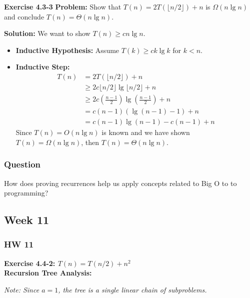 \documentclass{article}
\theoremstyle{theorem}
\theoremstyle{definition}
\theoremstyle{remark}
\begin{document}
\textbf{Exercise 4.3-3}
\textbf{Problem:} Show that $T(n) = 2T(\lfloor n/2 \rfloor) + n$ is $\Omega(n \lg n)$ and conclude $T(n) = \Theta(n \lg n)$.

\textbf{Solution:}
We want to show $T(n) \geq cn \lg n$.
\begin{itemize}
    \item \textbf{Inductive Hypothesis:} Assume $T(k) \geq ck \lg k$ for $k < n$.
    \item \textbf{Inductive Step:}
    \begin{align*}
    T(n) &= 2T(\lfloor n/2 \rfloor) + n \\
    &\geq 2c \lfloor n/2 \rfloor \lg \lfloor n/2 \rfloor + n \\
    &\geq 2c \left(\frac{n-1}{2}\right) \lg \left(\frac{n-1}{2}\right) + n \\
    &= c(n-1)(\lg(n-1) - 1) + n \\
    &= c(n-1)\lg(n-1) - c(n-1) + n
    \end{align*}
    Since $T(n) = O(n \lg n)$ is known and we have shown $T(n) = \Omega(n \lg n)$, then $T(n) = \Theta(n \lg n)$.
\end{itemize}

\subsubsection{Question}
How does proving recurrences help us apply concepts related to Big O to to programming?

\subsection{Week 11}

\subsubsection{HW 11}

\textbf{Exercise 4.4-2: $T(n) = T(n/2) + n^2$} \\
\textbf{Recursion Tree Analysis:}
\begin{center}
\end{center}
\textit{Note: Since $a=1$, the tree is a single linear chain of subproblems.}
\end{document}
